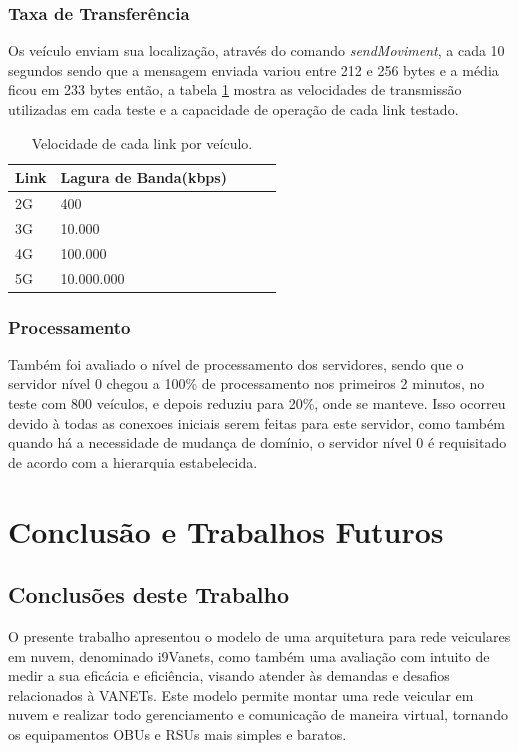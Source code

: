 \documentclass[
	12pt,				%
	oneside,			%
	a4paper,			%
	english,			%
	brazil				%
	]{abntex2ppgsi}
\begin{document}
\subsection{Taxa de Transferência}

Os veículo enviam sua localização, através do comando \textit{sendMoviment}, a cada 10 segundos sendo que a mensagem enviada variou entre 212 e 256 bytes e a média ficou em 233 bytes então, a tabela \ref{tbLink} mostra as velocidades de transmissão utilizadas em cada teste e a capacidade de operação de cada link testado. 

\begin{table}[!h]
	\centering
	\caption{Velocidade de cada link por veículo.}
	\label{tbLink}
	\begin{tabular}{|p{2.0cm}|p{4.0cm}|p{3.0cm}|p{2.0cm}|p{2.0cm}|}
		\hline
		\rowcolor[gray]{0.7}
		Link & Lagura de Banda(kbps)           \\ \hline
		\cellcolor[gray]{0.7}2G              & 400  \\ \hline
		\cellcolor[gray]{0.7}3G             & 10.000    \\ \hline
		\cellcolor[gray]{0.7}4G             & 100.000    \\ \hline
		\cellcolor[gray]{0.7}5G             & 10.000.000    \\ \hline
	\end{tabular}
\end{table}


\subsection{Processamento}

Também foi avaliado o nível de processamento dos servidores, sendo que o servidor nível 0 chegou a 100\% de processamento nos primeiros 2 minutos, no teste com 800 veículos, e depois reduziu para 20\%, onde se manteve. Isso ocorreu devido à todas as conexoes iniciais serem feitas para este servidor, como também quando há a necessidade de mudança de domínio, o servidor nível 0 é requisitado de acordo com a hierarquia estabelecida. 

\chapter{Conclusão e Trabalhos Futuros}\label{sec:conclusao}

\section{Conclusões deste Trabalho}
O presente trabalho apresentou o modelo de uma arquitetura para rede veiculares em nuvem, denominado i9Vanets, como também uma avaliação com intuito de medir a sua eficácia e eficiência, visando atender às demandas e desafios relacionados à VANETs. Este modelo permite montar uma rede veicular em nuvem e realizar todo gerenciamento e comunicação de maneira virtual, tornando os equipamentos OBUs e RSUs mais simples e baratos.
\end{document}

